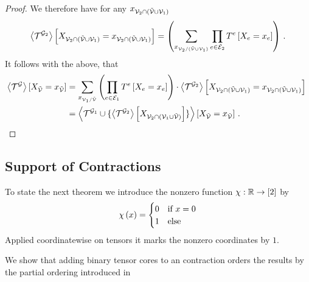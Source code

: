 \begin{proof}
	We therefore have for any $x_{\mathcal{V}_2\cap(\tilde{\mathcal{V}}\cup\mathcal{V}_1)}$ 
	\begin{align*}
		\left\langle \mathcal{T}^{\mathcal{G}_2}\right\rangle \left[ X_{\mathcal{V}_2\cap(\tilde{\mathcal{V}}\cup\mathcal{V}_1)}=x_{\mathcal{V}_2\cap(\tilde{\mathcal{V}}\cup\mathcal{V}_1)} \right] =
		 \left( \sum_{x_{\mathcal{V}_2/(\tilde{\mathcal{V}}\cup\mathcal{V}_1)}}  \prod_{e\in\mathcal{E}_2} T^{e}\left[X_{e}=x_{e}\right]  \right) \, . 
	\end{align*}
	It follows with the above, that 
	\begin{align*}
		\contractionof{\tnetof{\graph}}{\indexedcatvariableof{\secnodes}} 
		& =  \sum_{\catindexof{\nodes_1/\secnodes}}  \left( \prod_{\edge\in\edges_1} \hypercoreofat{\edge}{\indexedcatvariableof{\edge}} \right) \cdot \sbcontractionof{\tnetof{\graph_2}}{\indexedcatvariableof{\nodes_2\cap(\secnodes\cup\nodes_1)}} \\
		& = \contractionof{\tnetof{\graph_1} \cup \{
			\contractionof{\tnetof{\graph_2}}{\catvariableof{\nodes_2\cap(\nodes_1\cup\secnodes)}}
		\}}{\indexedcatvariableof{\secnodes}}   \, . 
	\end{align*}
\end{proof}







\subsection{Support of Contractions}\label{sec:supportContractionEquations}



To state the next theorem we introduce the nonzero function $\chi: \mathbb{R} \rightarrow [2]$ by
\begin{align}
	\chi\left(x\right) = \begin{cases}
	0 & \text{if }x=0 \\
	1 & \text{else}
	\end{cases}
\end{align}
Applied coordinatewise on tensors it marks the nonzero coordinates by $1$.

We show that adding binary tensor cores to an contraction orders the results by the partial ordering introduced in 

